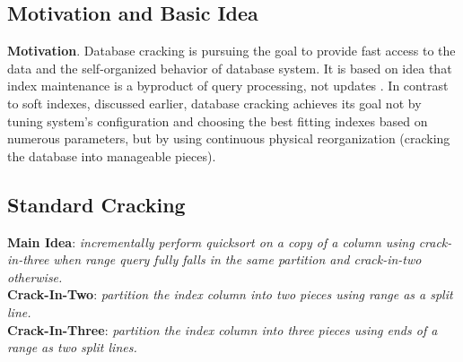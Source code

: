 \documentclass[10pt, conference, compsocconf]{IEEEtran}
\begin{document}
\subsection{Motivation and Basic Idea}
\label{subsec:crack_idea}
\textbf{Motivation}. Database cracking is pursuing the goal to provide fast access to the data and the self-organized behavior of database system. It is based on idea that index maintenance is a byproduct of query processing, not updates \cite{cracking}. In contrast to soft indexes, discussed earlier, database cracking achieves its goal not by tuning system's configuration and choosing the best fitting indexes based on numerous parameters, but by using continuous physical reorganization (cracking the database into manageable pieces).

\subsection{Standard Cracking}
\label{subsec:st_crack}
\textbf{Main Idea}: \textit{incrementally perform quicksort on a copy of a column using crack-in-three when range query fully falls in the same partition and crack-in-two otherwise.}\\

\textbf{Crack-In-Two}: \textit{partition the index column into two pieces using range as a split line.}\\

\textbf{Crack-In-Three}: \textit{partition the index column into three pieces using ends of a range as two split lines.}\\
\end{document}
